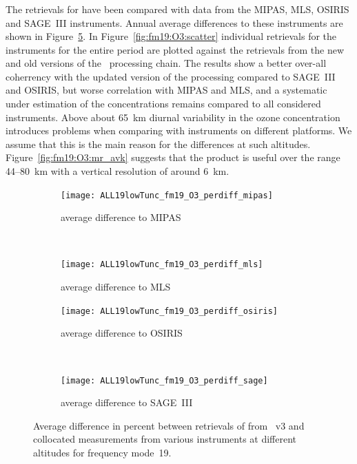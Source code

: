 \subsubsection{}
\label{sec:fm19:comparison:O3}
The retrievals for  have been compared with data from the MIPAS, MLS,
OSIRIS and SAGE~III instruments. Annual average differences to these
instruments are shown in Figure~\ref{fig:fm19:O3:profiles}. In
Figure~\ref{fig:fm19:O3:scatter} individual retrievals for the instruments for
the entire period are plotted against the retrievals from the new and old
versions of the \smr\ processing chain. The results show a better over-all
coherrency with the updated version of the processing compared to SAGE~III and
OSIRIS, but worse correlation with MIPAS and MLS, and a systematic under
estimation of the concentrations remains compared to all considered
instruments.  Above about 65~km diurnal variability in the ozone concentration
introduces problems when comparing with instruments on different platforms. We
assume that this is the main reason for the differences at such altitudes.
Figure~\ref{fig:fm19:O3:mr_avk} suggests that the product is useful over the
range 44--80~km with a vertical resolution of around 6~km.


\begin{figure}[tbhp]
    \centering
    \begin{subfigure}[b]{0.49\textwidth}
        \texttt{[image: ALL19lowTunc\_fm19\_O3\_perdiff\_mipas]}
        \caption{average difference to MIPAS}
        \label{fig:fm19:O3:profiles:MIPAS}
    \end{subfigure}
    \,
    \begin{subfigure}[b]{0.49\textwidth}
        \texttt{[image: ALL19lowTunc\_fm19\_O3\_perdiff\_mls]}
        \caption{average difference to MLS}
        \label{fig:fm19:O3:profiles:MLS}
    \end{subfigure}

    \begin{subfigure}[b]{0.49\textwidth}
        \texttt{[image: ALL19lowTunc\_fm19\_O3\_perdiff\_osiris]}
        \caption{average difference to OSIRIS}
        \label{fig:fm19:O3:profiles:OSIRIS}
    \end{subfigure}
    \,
    \begin{subfigure}[b]{0.49\textwidth}
        \texttt{[image: ALL19lowTunc\_fm19\_O3\_perdiff\_sage]}
        \caption{average difference to SAGE~III}
        \label{fig:fm19:O3:profiles:SAGEIII}
    \end{subfigure}
    \caption{Average difference in percent between retrievals of 
    from \smr~v3 and collocated measurements from various instruments at
    different altitudes for frequency mode~19.}

    \label{fig:fm19:O3:profiles}
\end{figure}

